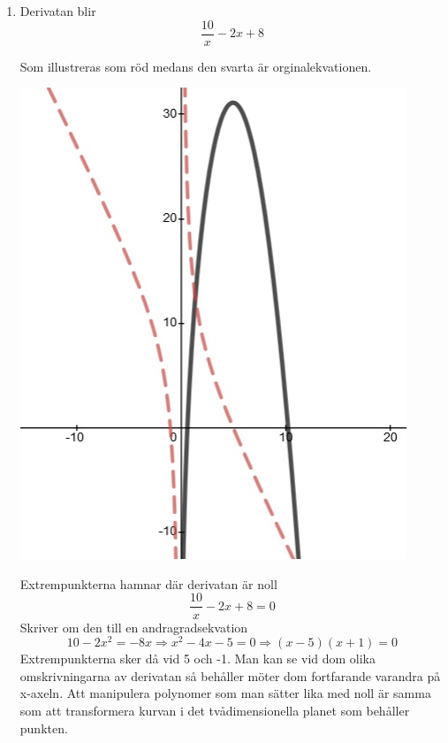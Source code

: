\documentclass[a4paper,12pt]{article}
\begin{document}
\begin{enumerate}
    \item
    Derivatan blir
    $$\frac{10}{x}-2x+8$$

    Som illustreras som röd medans den svarta är orginalekvationen.
    
    \begin{center}
        \includegraphics[scale=0.6]{Figur 2.jpg}
    \end{center}
    
    Extrempunkterna hamnar där derivatan är noll
    $$\frac{10}{x}-2x+8=0$$
    Skriver om den till en andragradsekvation
    $$10-2x^2=-8x\Rightarrow x^2-4x-5=0\Rightarrow (x-5)(x+1)=0$$
    Extrempunkterna sker då vid 5 och -1.
    Man kan se vid dom olika omskrivningarna av derivatan
    så behåller möter dom fortfarande varandra på x-axeln.
    Att manipulera polynomer som man sätter lika med noll är samma
    som att transformera kurvan i det tvådimensionella planet som behåller
    punkten.


\end{enumerate}
\end{document}
